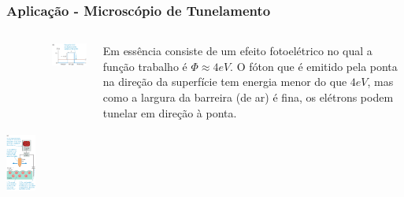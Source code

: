\documentclass[12pt,brazil,table]{beamer}
\begin{document}
  


\begin{frame}
  \frametitle{Aplicação - Microscópio de Tunelamento}
  \fontsize{9pt}{11pt}\selectfont
  
  \begin{columns}
   
    \includegraphics[height=8cm]{figuras/fig37}
    \begin{center}
     \includegraphics[width=5cm]{figuras/fig37b}
    \end{center}
    \vspace*{0.5cm}
    Em essência consiste de um efeito fotoelétrico no qual a função trabalho é $\Phi\approx 4 eV$.  O fóton que é emitido pela ponta na direção da superfície tem energia menor do que $4 eV$, mas como a largura da barreira (de ar) é fina, os elétrons podem tunelar em direção à ponta.
  \end{columns}

\end{frame}


  
\end{document}
